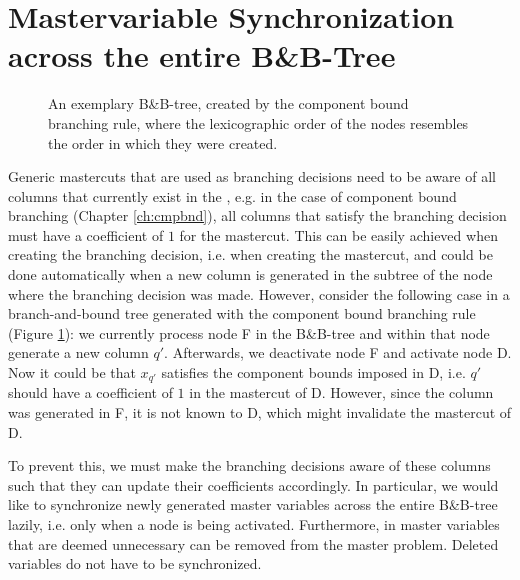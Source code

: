 \section{Mastervariable Synchronization across the entire B\&B-Tree}\label{sec:gm_sync}
\begin{figure}[H]
\centering
{}
\caption{An exemplary B\&B-tree, created by the component bound branching rule, where the lexicographic order of the nodes resembles the order in which they were created.}
\label{fig:gm_sync_tree}
\end{figure}

Generic mastercuts that are used as branching decisions need to be aware of all columns that currently exist in the \RMP{}, e.g. in the case of component bound branching (Chapter \ref{ch:cmpbnd}), all columns that satisfy the branching decision must have a coefficient of $1$ for the mastercut. This can be easily achieved when creating the branching decision, i.e. when creating the mastercut, and could be done automatically when a new column is generated in the subtree of the node where the branching decision was made. However, consider the following case in a branch-and-bound tree generated with the component bound branching rule (Figure \ref{fig:gm_sync_tree}): we currently process node F in the B\&B-tree and within that node generate a new column $q'$. Afterwards, we deactivate node F and activate node D. Now it could be that $x_{q'}$ satisfies the component bounds imposed in D, i.e. $q'$ should have a coefficient of $1$ in the mastercut of D. However, since the column was generated in F, it is not known to D, which might invalidate the mastercut of D.

To prevent this, we must make the branching decisions aware of these columns such that they can update their coefficients accordingly. In particular, we would like to synchronize newly generated master variables across the entire B\&B-tree lazily, i.e. only when a node is being activated. Furthermore, in \GCG{} master variables that are deemed unnecessary can be removed from the master problem. Deleted variables do not have to be synchronized.

